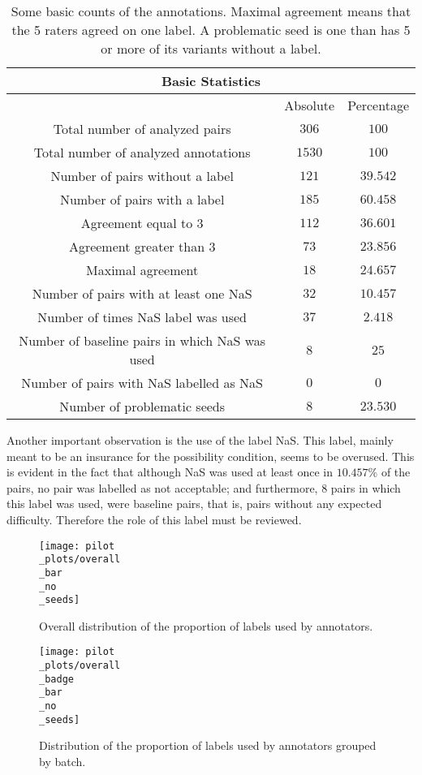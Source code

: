 \begin{table}
\centering
\begin{tabular}{|c|c|c|}
\hline
\multicolumn{3}{|c|}{Basic Statistics}\\\hline
  & Absolute & Percentage \\\hline
Total number of analyzed pairs & $306$ & $100$\\\hline
Total number of analyzed annotations & $1530$ & $100$\\\hline
Number of pairs without a label & $121$ & $39.542$\\\hline
Number of pairs with a label & $185$ & $60.458$\\\hline
Agreement equal to 3 & $112$ & $36.601$\\\hline 
Agreement greater than 3 & $73$ & $23.856$\\\hline
Maximal agreement & $18$ & $24.657$\\\hline
Number of pairs with at least one NaS & $32$ & $10.457$\\\hline
Number of times NaS label was used & $37$ & $2.418$\\\hline
Number of baseline pairs in which NaS was used & $8$ & $25$\\\hline
Number of pairs with NaS labelled as NaS & $0$ & $0$\\\hline
Number of problematic seeds & $8$ & $23.530$\\\hline                                                  
\end{tabular}
\caption[Basic counts of the annotations.]{Some basic counts of the annotations. Maximal agreement means that the 5 raters agreed on one label. A problematic seed is one than has 5 or more of its variants without a label.}
\label{tab:pilbasstats}
\end{table}

Another important observation is the use of the label NaS. This label, mainly meant to be an insurance for the possibility condition, seems to be overused. This is evident in the fact that although NaS was used at least once in $10.457\%$ of the pairs, no pair was labelled as not acceptable; and furthermore, $8$ pairs in which this label was used, were baseline pairs, that is, pairs without any expected difficulty. Therefore the role of this label must be reviewed.\\ 

\begin{figure}
\centering
\parbox{10cm}{\texttt{[image: pilot\\\_plots/overall\\\_bar\\\_no\\\_seeds]}
\caption[Distribution of labels.]{Overall distribution of the proportion of labels used by annotators.}\label{fig:pilallbar}}
\qquad
\begin{minipage}{10cm}
\texttt{[image: pilot\\\_plots/overall\\\_badge\\\_bar\\\_no\\\_seeds]}
\caption[Distribution of labels by batch.]{Distribution of the proportion of labels used by annotators grouped by batch.}\label{fig:batchbar}
\end{minipage}
\end{figure}


